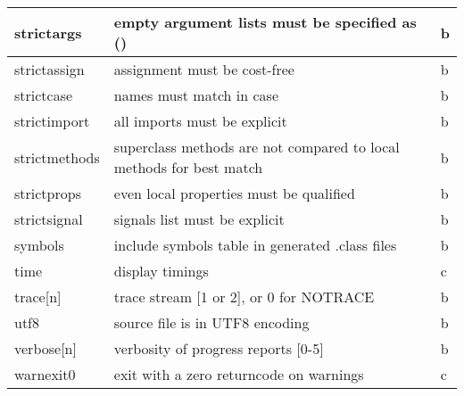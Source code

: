 \begin{longtable}[l]{|l|p{10cm}|l|}
 strictargs   & empty argument lists must be specified as () &b \\
\hline
 strictassign & assignment must be cost-free &b \\
\hline
 strictcase   & names must match in case &b \\
\hline
 strictimport & all imports must be explicit &b \\
\hline
 strictmethods & superclass methods are not compared to local methods for best match &b \\
\hline
 strictprops  & even local properties must be qualified &b \\
\hline
 strictsignal & signals list must be explicit &b \\
\hline
 symbols      & include symbols table in generated .class files &b \\
\hline
 time         & display timings &c \\
\hline
 trace[n]     & trace stream [1 or 2], or 0 for NOTRACE &b \\
\hline
 utf8         & source file is in UTF8 encoding &b \\
\hline
 verbose[n]   & verbosity of progress reports [0-5] &b \\
\hline
 warnexit0    & exit with a zero returncode on warnings &c \\
\hline
\end{longtable}

